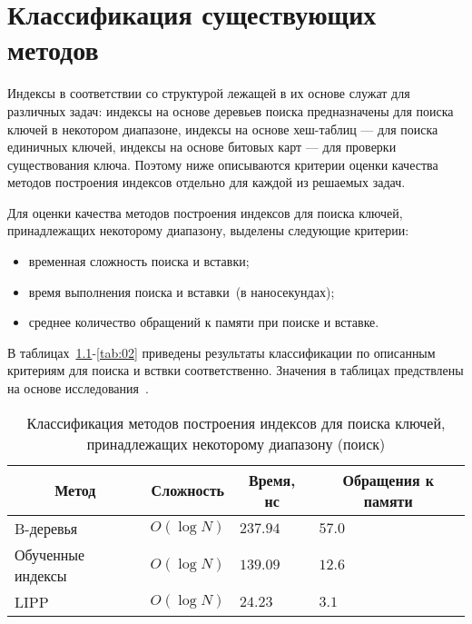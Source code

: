 \chapter{Классификация существующих методов\label{classification}}

Индексы в соответствии со структурой лежащей в их основе служат для различных
задач: индексы на основе деревьев поиска предназначены для поиска ключей в
некотором диапазоне, индексы на основе хеш-таблиц --- для поиска единичных
ключей, индексы на основе битовых карт --- для проверки существования ключа.
Поэтому ниже описываются критерии оценки качества методов построения индексов
отдельно для каждой из решаемых задач.

Для оценки качества методов построения индексов для поиска ключей, принадлежащих
некоторому диапазону, выделены следующие критерии:
\begin{itemize}
    \item временная сложность поиска и вставки;
    \item время выполнения поиска и вставки~(в наносекундах);
    \item среднее количество обращений к памяти при поиске и вставке.
\end{itemize}

В таблицах~\ref{tab:01}-\ref{tab:02} приведены результаты классификации по
описанным критериям для поиска и вствки соответственно. Значения в таблицах
предствлены на основе исследования~\cite{ulipp}.

{
\captionsetup{format=hang,justification=raggedright,
              singlelinecheck=off,width=16.8cm}
\begin{longtable}[Hc]{|p{5cm}|p{2cm}|p{2cm}|p{2cm}|}
\caption{Классификация методов построения индексов для поиска ключей,
принадлежащих некоторому диапазону (поиск)\label{tab:01}}\\
    \hline
    \multicolumn{1}{|c}{\textbf{Метод}} &
    \multicolumn{1}{|c|}{\textbf{Сложность}} &
    \multicolumn{1}{|c|}{\textbf{Время, нс}} &
    \multicolumn{1}{c|}{\parbox{3cm}{\vspace{2mm}\centering\textbf{Обращения к
    памяти}}}\\[2.5ex]
    \hline
    B-деревья & $O(\log N)$
    & $237.94$
    & $57.0$\\
    \hline
    Обученные индексы & $O(\log N)$
    & $139.09$
    & $12.6$\\
    \hline
    LIPP & $O(\log N)$
    & $24.23$
    & $3.1$\\
    \hline
\end{longtable}
}

